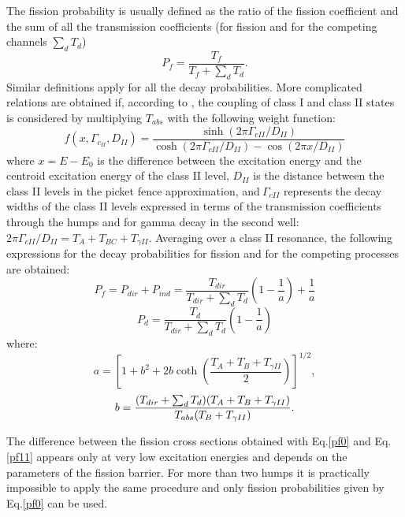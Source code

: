 The fission probability is usually defined as the ratio of the fission
coefficient and the sum of all the transmission coefficients (for fission
and for the competing channels $\sum_dT_d$)
\begin{equation}
P_{f}=\frac{T_{f}}{T_{f}+\sum_{d}T_{d}}.  \label{pf0}
\end{equation}
Similar definitions apply for all the decay probabilities. More complicated
relations are obtained if, according to \cite{Back:74}, the coupling of
class I and class II states is considered by multiplying $T_{abs}$ with the
following weight function:%
\begin{equation}
f(x,\Gamma_{c_{II}},D_{II})=\frac{\sinh(2\pi\Gamma_{cII}/D_{II})}{\cosh
(2\pi\Gamma_{cII}/D_{II})-\cos(2\pi x/D_{II})}
\end{equation}
where $x=E-E_{0}$ is the difference between the excitation energy and the
centroid excitation energy of the class II level, $D_{II}$ is the distance
between the class II levels in the picket fence approximation, and$\ \Gamma
_{cII}$ represents the decay widths of the class II levels expressed in
terms of the transmission coefficients through the humps and for gamma decay
in the second well:\ $2\pi\Gamma_{cII}/D_{II}=T_{A}+T_{BC}+T_{\gamma II}.$
Averaging over a class II resonance, the following expressions for the decay
probabilities for fission and for the competing processes are obtained:%
\begin{equation}
P_{f}=P_{dir}+P_{ind}=\frac{T_{dir}}{T_{dir}+\sum_{d}T_{d}}\left( 1-\frac {1%
}{a}\right) +\frac{1}{a}  \label{pf11}
\end{equation}
\begin{equation}
P_{d}=\frac{T_{d}}{T_{dir}+\sum_{d}T_{d}}\left( 1-\frac{1}{a}\right)
\label{pd}
\end{equation}
where:
\begin{equation}
a=\left[ 1+b^{2}+2b\coth\left( \frac{T_{A}+T_{B}+T_{\gamma II}}{2}\right) %
\right] ^{1/2},  \label{a11}
\end{equation}%
\begin{equation}
b=\frac{(T_{dir}+\sum_{d}T_{d})(T_{A}+T_{B}+T_{\gamma II})}{%
T_{abs}(T_{B}+T_{\gamma II})}.  \label{b11}
\end{equation}

The difference between the fission cross sections obtained with Eq.\ref{pf0}
and Eq.\ref{pf11} appears only at very low excitation energies and depends
on the parameters of the fission barrier. For more than two humps it is
practically impossible to apply the same procedure and only fission
probabilities given by Eq.\ref{pf0} can be used.

